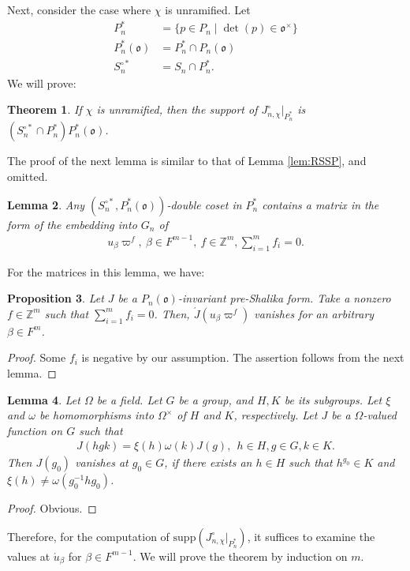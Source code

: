 \documentclass[11pt]{amsart}
\newcommand\w{\omega}
\newcommand\Vp{\varpi}%
\newcommand\vp{\varphi}%
\newcommand\oo{\mathfrak{o}}
\newcommand\Z{{\mathbb{Z}}}
\newcommand\1{\mathbf{1}}
\newcommand\nid{\noindent}
\newcommand\ac{\acute}
\newcommand\tm{\times}
\newcommand\supp{{\mathrm{supp}}}%
\numberwithin{equation}{section}
\newtheorem{thm}{Theorem}[section]
\newtheorem{prop}[thm]{Proposition}
\newtheorem{lem}[thm]{Lemma}
\begin{document}
Next, consider the case where $\chi$ is unramified.
Let 
\begin{align*}
P_n^*&= \{p \in P_n \mid \det(p) \in \oo^\tm\} \\
P_n^*(\oo)&= P_n^* \cap P_n(\oo) \\
S_n^{\circ *}&= S_n \cap P_n^*.
\end{align*} 
We will prove:
\begin{thm}\label{thm:unrpsi}
If $\chi$ is unramified, then the support of $J_{n,\chi}^\circ|_{P_n^*}$ is $(S_n^{\circ *} \cap P_n^*) P_n^*(\oo)$.
\end{thm}
\nid
The proof of the next lemma is similar to that of Lemma \ref{lem:RSSP}, and omitted.
\begin{lem}
Any $(S_{n}^{\circ*}, P_{n}^*(\oo))$-double coset in $P_{n}^*$ contains a matrix in the form of the embedding into $G_{n}$ of   
\begin{align*}
u_\beta \Vp^f, \ \beta \in F^{m-1}, \ f \in \Z^{m}, \sum_{i=1}^{m} f_i =0.
\end{align*} 
\end{lem}
\nid
For the matrices in this lemma, we have:
\begin{prop}\label{prop:chiurfnonzeo}
Let $J$ be a $P_n(\oo)$-invariant pre-Shalika form.
Take a nonzero $f \in \Z^m$ such that $\sum_{i=1}^m f_i = 0$.
Then, $\ac{J}(u_\beta \Vp^f)$ vanishes for an arbitrary $\beta \in F^m$.
\end{prop}
\begin{proof}
Some $f_i$ is negative by our assumption.
The assertion follows from the next lemma.
\end{proof}
\begin{lem}\label{lem:vanishlem}
Let $\Omega$ be a field.
Let $G$ be a group, and $H, K$ be its subgroups.
Let $\xi$ and $\w$ be homomorphisms into $\Omega^\tm$ of $H$ and $K$, respectively.
Let $J$ be a $\Omega$-valued function on $G$ such that 
\begin{align*}
J(hgk) = \xi(h)\w(k) J(g), \ \ h \in H, g \in G, k \in K.
\end{align*} 
Then $J(g_0)$ vanishes at $g_0 \in G$, if there exists an $h \in H$ such that $h^{g_0} \in K$ and $\xi(h) \neq \w(g_0^{-1} h g_0)$.
\end{lem} 
\begin{proof}
Obvious.
\end{proof}
\nid
Therefore, for the computation of $\supp(J_{n,\chi}^\circ|_{P_n^*})$, it suffices to examine the values at $\ac{u}_\beta$ for $\beta \in F^{m-1}$.
We will prove the theorem by induction on $m$.
\end{document}
